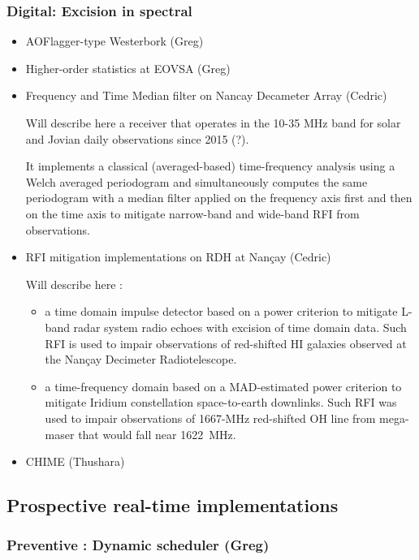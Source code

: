 \subsubsection{Digital: Excision in spectral}
\begin{itemize}
\item AOFlagger-type Westerbork (Greg)
\item Higher-order statistics at EOVSA (Greg)

\item Frequency and Time Median filter on Nancay Decameter Array (Cedric)

Will describe here a receiver that operates in the 10-35 MHz band for solar and Jovian daily observations since 2015 (?).

It implements a classical (averaged-based) time-frequency analysis using a Welch averaged periodogram and simultaneously computes the same periodogram with a median filter applied on the frequency axis first and then on the time axis to mitigate narrow-band and wide-band RFI from observations.

\item RFI mitigation implementations on RDH at Nançay (Cedric)

Will describe here :
\begin{itemize}
\item a time domain impulse detector based on a power criterion to mitigate L-band radar system radio echoes with excision of time domain data.  Such RFI is used to impair observations of red-shifted HI galaxies observed at the Nançay Decimeter Radiotelescope.
\item a time-frequency domain based on a MAD-estimated power criterion to mitigate Iridium constellation space-to-earth downlinks.  Such RFI was used to impair observations of 1667-MHz red-shifted OH line from mega-maser that would fall near 1622\ MHz.
\end{itemize}


\item CHIME (Thushara)
\end{itemize}

\subsection{Prospective real-time implementations}
\label{subsection:hardware:catalog:prospective}

\subsubsection{Preventive : Dynamic scheduler (Greg)}
